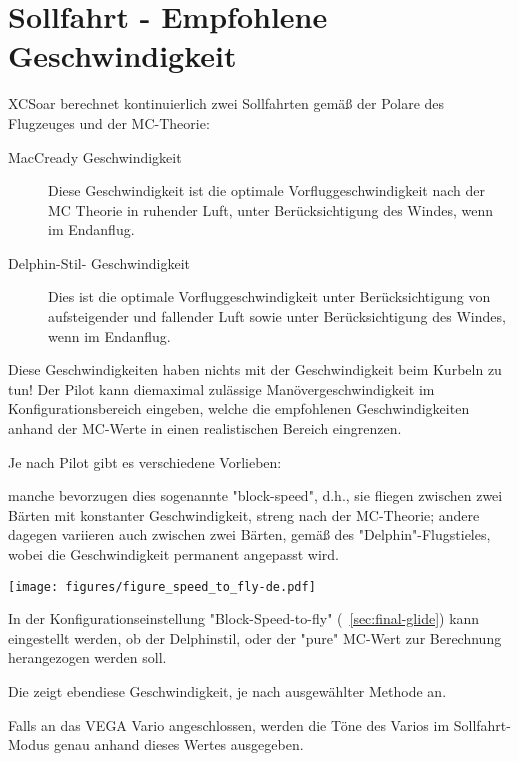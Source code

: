 \section{Sollfahrt - Empfohlene Geschwindigkeit}

\textsf{XCSoar} berechnet kontinuierlich zwei Sollfahrten gemäß der Polare des Flugzeuges und der
MC-Theorie:

\begin{description}
\item[MacCready Geschwindigkeit]  Diese Geschwindigkeit ist die optimale Vorfluggeschwindigkeit nach der
MC Theorie in ruhender Luft, unter Berücksichtigung des Windes, wenn im Endanflug.
\item[Delphin-Stil- Geschwindigkeit]  Dies ist die optimale Vorfluggeschwindigkeit unter
    Berücksichtigung von aufsteigender und fallender Luft sowie unter Berücksichtigung des Windes,
    wenn im Endanflug.
\end{description}

Diese Geschwindigkeiten haben nichts mit der Geschwindigkeit beim Kurbeln zu tun!
Der Pilot kann diemaximal zulässige Manövergeschwindigkeit im Konfigurationsbereich
eingeben, welche die empfohlenen Geschwindigkeiten anhand der MC-Werte in einen
realistischen Bereich eingrenzen.

Je nach Pilot gibt es verschiedene Vorlieben:

manche bevorzugen dies sogenannte "block-speed", d.h., sie fliegen zwischen zwei Bärten mit konstanter
Geschwindigkeit, streng nach der MC-Theorie; andere dagegen
variieren auch zwischen zwei Bärten, gemäß des "Delphin"-Flugstieles, wobei die
Geschwindigkeit permanent angepasst wird.


\begin{maxipage}
\begin{center}
\texttt{[image: figures/figure\_speed\_to\_fly-de.pdf]}
\end{center}
\end{maxipage}

In der Konfigurationseinstellung "Block-Speed-to-fly" (~\ref{sec:final-glide})
kann eingestellt werden, ob der Delphinstil, oder der "pure" MC-Wert zur
Berechnung herangezogen werden soll.

Die  zeigt ebendiese Geschwindigkeit, je nach
ausgewählter Methode an.

Falls an das VEGA Vario angeschlossen, werden die Töne des Varios im Sollfahrt-Modus
genau anhand dieses Wertes ausgegeben.


